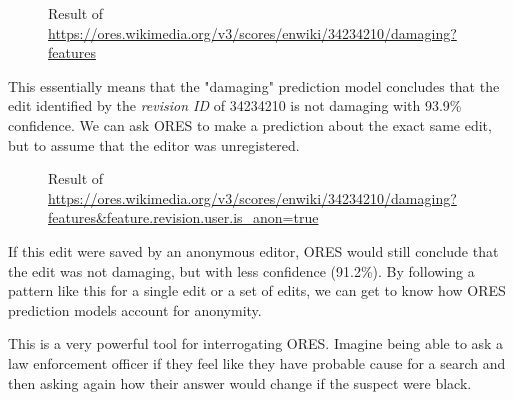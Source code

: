 \begin{figure}[htbp]
        \caption{Result of \url{https://ores.wikimedia.org/v3/scores/enwiki/34234210/damaging?features}}
        \label{fig:english_damaging_features}
\end{figure}

This essentially means that the "damaging" prediction model concludes that the edit identified by the \emph{revision ID} of 34234210 is not damaging with 93.9\% confidence.  We can ask ORES to make a prediction about the exact same edit, but to assume that the editor was unregistered.

\begin{figure}[htbp]
        \caption{Result of \url{https://ores.wikimedia.org/v3/scores/enwiki/34234210/damaging?features&feature.revision.user.is_anon=true}}
        \label{fig:english_damaging_features}
\end{figure}

If this edit were saved by an anonymous editor, ORES would still conclude that the edit was not damaging, but with less confidence (91.2\%).  By following a pattern like this for a single edit or a set of edits, we can get to know how ORES prediction models account for anonymity.

This is a very powerful tool for interrogating ORES.  Imagine being able to ask a law enforcement officer if they feel like they have probable cause for a search and then asking again how their answer would change if the suspect were black.

